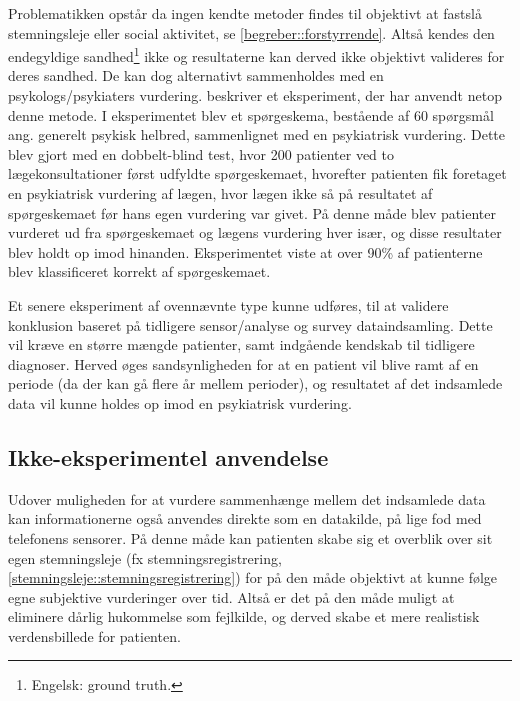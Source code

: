 Problematikken opstår da ingen kendte metoder findes til objektivt at fastslå stemningsleje eller social aktivitet, se \cref{begreber::forstyrrende}.
Altså kendes den endegyldige sandhed\footnote{Engelsk: ground truth.} ikke og resultaterne kan derved ikke objektivt valideres for deres sandhed.
De kan dog alternativt sammenholdes med en psykologs/psykiaters vurdering.
 beskriver et eksperiment, der har anvendt netop denne metode.
I eksperimentet blev et spørgeskema, bestående af 60 spørgsmål ang. generelt psykisk helbred, sammenlignet med en psykiatrisk vurdering.
Dette blev gjort med en dobbelt-blind test, hvor 200 patienter ved to lægekonsultationer først udfyldte spørgeskemaet, hvorefter patienten fik foretaget en psykiatrisk vurdering af lægen, hvor lægen ikke så på resultatet af spørgeskemaet før hans egen vurdering var givet.
På denne måde blev patienter vurderet ud fra spørgeskemaet og lægens vurdering hver især, og disse resultater blev holdt op imod hinanden.
Eksperimentet viste at over 90\% af patienterne blev klassificeret korrekt af spørgeskemaet.

Et senere eksperiment af ovennævnte type kunne udføres, til at validere konklusion baseret på tidligere sensor/analyse og survey dataindsamling.
Dette vil kræve en større mængde patienter, samt indgående kendskab til tidligere diagnoser.
Herved øges sandsynligheden for at en patient vil blive ramt af en periode (da der kan gå flere år mellem perioder), og resultatet af det indsamlede data vil kunne holdes op imod en psykiatrisk vurdering.

\subsection{Ikke-eksperimentel anvendelse}
Udover muligheden for at vurdere sammenhænge mellem det indsamlede data kan informationerne også anvendes direkte som en datakilde, på lige fod med telefonens sensorer.
På denne måde kan patienten skabe sig et overblik over sit egen stemningsleje (fx stemningsregistrering, \cref{stemningsleje::stemningsregistrering}) for på den måde objektivt at kunne følge egne subjektive vurderinger over tid.
Altså er det på den måde muligt at eliminere dårlig hukommelse som fejlkilde, og derved skabe et mere realistisk verdensbillede for patienten.
